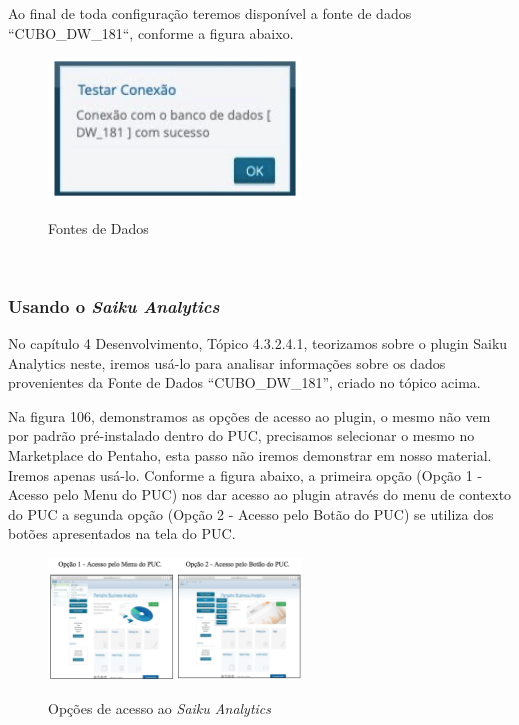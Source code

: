 Ao final de toda configura\c{c}\~{a}o teremos dispon\'{i}vel a fonte de dados ``CUBO_DW_181``, 
conforme a figura abaixo.

\begin{figure}[H]
	\vspace*{0,2cm}
    \centering
    \caption{Fontes de Dados}
    \includegraphics[width=0.6\textwidth]{./04-figuras/figura-puc-testando-uma-nova-conexao}
    \label{fig:ilustfigpuctestandoumanovaconexao}
\end{figure}
\vspace*{-0,9cm}
{\raggedright {}} \\

\subsubsection{Usando o \textit{Saiku Analytics}}

No cap\'{i}tulo 4 Desenvolvimento, T\'{o}pico 4.3.2.4.1, teorizamos sobre o plugin Saiku Analytics neste, iremos us\'{a}-lo 
para analisar informa\c{c}\~{o}es sobre os dados provenientes da Fonte de Dados ``CUBO\_DW\_181'', criado no t\'{o}pico acima.


Na figura 106, demonstramos as op\c{c}\~{o}es de acesso ao plugin, o mesmo n\~{a}o vem por padr\~{a}o pr\'{e}-instalado dentro do PUC, 
precisamos selecionar o mesmo no Marketplace do Pentaho, esta passo n\~{a}o iremos demonstrar em nosso material. Iremos apenas us\'{a}-lo.
Conforme a figura abaixo, a primeira op\c{c}\~{a}o (Op\c{c}\~{a}o 1 - Acesso pelo Menu do PUC) nos dar acesso ao plugin atrav\'{e}s do menu 
de contexto do PUC a segunda op\c{c}\~{a}o (Op\c{c}\~{a}o 2 - Acesso pelo Bot\~{a}o do PUC) se utiliza dos bot\~{o}es apresentados na tela do PUC.

\begin{figure}[H]
	\vspace*{0,2cm}
    \centering
    \caption{Op\c{c}\~{o}es de acesso ao \textit{Saiku Analytics}}
    \includegraphics[width=0.6\textwidth]{./04-figuras/figura-puc-saiku-opcoes-acesso}
    \label{fig:ilustfigpucsaikuopcoesacesso}
\end{figure}
\vspace*{-0,9cm}
{\raggedright {}} \\

